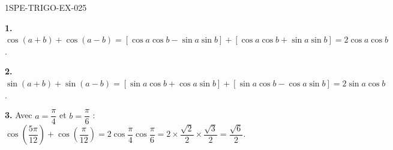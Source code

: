\begin{corrige}{1SPE-TRIGO-EX-025}

\textbf{1.} $\cos(a+b) + \cos(a-b) = [\cos a\cos b - \sin a\sin b] + [\cos a\cos b + \sin a\sin b] = 2\cos a\cos b$.

\textbf{2.} $\sin(a+b) + \sin(a-b) = [\sin a\cos b + \cos a\sin b] + [\sin a\cos b - \cos a\sin b] = 2\sin a\cos b$.

\textbf{3.} Avec $a = \dfrac{\pi}{4}$ et $b = \dfrac{\pi}{6}$ : $\cos\!\left(\dfrac{5\pi}{12}\right) + \cos\!\left(\dfrac{\pi}{12}\right) = 2\cos\dfrac{\pi}{4}\cos\dfrac{\pi}{6} = 2 \times \dfrac{\sqrt{2}}{2} \times \dfrac{\sqrt{3}}{2} = \dfrac{\sqrt{6}}{2}$.

\end{corrige}
